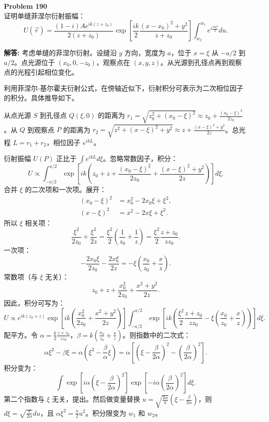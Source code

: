 \documentclass[12pt, a4paper, oneside]{ctexart}
\newenvironment{solution}{\par\noindent\textbf{解答:}\quad}{\par}
\begin{document}
\begin{mdframed}[backgroundcolor=gray!10, linewidth=0pt]
    \textbf{Problem 190} \\
    证明单缝菲涅尔衍射振幅：
    \[
    U(\vec{r}) = \frac{(1-i)A e^{i k(z+z_0)}}{2(z+z_0)} \exp\left[ \frac{i k}{2} \frac{(x-x_0)^2 + y^2}{z+z_0} \right] \int_{w_2}^{w_1} e^{i \frac{\pi u^2}{2}} du.
    \]
\end{mdframed}
\begin{solution}
    考虑单缝的菲涅尔衍射。设缝沿 $y$ 方向，宽度为 $a$，位于 $x=\xi$ 从 $-a/2$ 到 $a/2$。点光源位于 $(x_0,0,-z_0)$，观察点在 $(x,y,z)$。从光源到孔径点再到观察点的光程引起相位变化。

    利用菲涅尔-基尔霍夫衍射公式，在傍轴近似下，衍射积分可表示为二次相位因子的积分。具体推导如下。

    从点光源 $S$ 到孔径点 $Q(\xi,0)$ 的距离为 $r_1 = \sqrt{z_0^2 + (x_0-\xi)^2} \approx z_0 + \frac{(x_0-\xi)^2}{2z_0}$。从 $Q$ 到观察点 $P$ 的距离为 $r_2 = \sqrt{z^2 + (x-\xi)^2 + y^2} \approx z + \frac{(x-\xi)^2 + y^2}{2z}$。总光程 $L = r_1 + r_2$，相位因子 $e^{i k L}$。

    衍射振幅 $U(P)$ 正比于 $\int e^{i k L} d\xi$。忽略常数因子，积分：
    \[
    U \propto \int_{-a/2}^{a/2} \exp\left[ i k \left( z_0 + z + \frac{(x_0-\xi)^2}{2z_0} + \frac{(x-\xi)^2 + y^2}{2z} \right) \right] d\xi.
    \]
    合并 $\xi$ 的二次项和一次项。展开：
    \begin{align*}
        (x_0-\xi)^2 &= x_0^2 - 2x_0\xi + \xi^2, \\
        (x-\xi)^2 &= x^2 - 2x\xi + \xi^2.
    \end{align*}
    所以 $\xi$ 相关项：
    \[
        \frac{\xi^2}{2z_0} + \frac{\xi^2}{2z} = \frac{\xi^2}{2} \left( \frac{1}{z_0} + \frac{1}{z} \right) = \frac{\xi^2}{2} \frac{z+z_0}{z z_0}.
    \]
    一次项：
    \[
        -\frac{2x_0\xi}{2z_0} - \frac{2x\xi}{2z} = -\xi \left( \frac{x_0}{z_0} + \frac{x}{z} \right).
    \]
    常数项（与 $\xi$ 无关）：
    \[
        z_0+z + \frac{x_0^2}{2z_0} + \frac{x^2+y^2}{2z}.
    \]
    因此，积分可写为：
    \[
    U \propto e^{i k (z_0+z)} \exp\left[ i k \left( \frac{x_0^2}{2z_0} + \frac{x^2+y^2}{2z} \right) \right] \int_{-a/2}^{a/2} \exp\left[ i k \left( \frac{\xi^2}{2} \frac{z+z_0}{z z_0} - \xi \left( \frac{x_0}{z_0} + \frac{x}{z} \right) \right) \right] d\xi.
    \]
    配平方。令 $\alpha = \frac{k}{2} \frac{z+z_0}{z z_0}$，$\beta = k \left( \frac{x_0}{z_0} + \frac{x}{z} \right)$。则指数中的二次式：
    \[
        \alpha \xi^2 - \beta \xi = \alpha \left( \xi^2 - \frac{\beta}{\alpha} \xi \right) = \alpha \left[ \left( \xi - \frac{\beta}{2\alpha} \right)^2 - \left( \frac{\beta}{2\alpha} \right)^2 \right].
    \]
    积分变为：
    \[
        \int \exp\left[ i \alpha \left( \xi - \frac{\beta}{2\alpha} \right)^2 \right] \exp\left[ -i \alpha \left( \frac{\beta}{2\alpha} \right)^2 \right] d\xi.
    \]
    第二个指数与 $\xi$ 无关，提出。然后做变量替换 $u = \sqrt{\frac{2\alpha}{\pi}} \left( \xi - \frac{\beta}{2\alpha} \right)$，则 $d\xi = \sqrt{\frac{\pi}{2\alpha}} du$，且 $\alpha \xi^2 = \frac{\pi}{2} u^2$。积分限变为 $w_1$ 和 $w_2$。


\end{solution}
\end{document}

